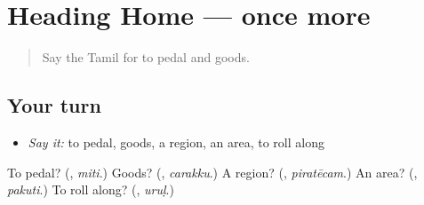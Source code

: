 \section[(dialogue)]{Heading Home — once more}

\label{lesson:TA-R452-review-final-452}



\begin{quote}
Say the Tamil for to pedal and goods.
\end{quote}

\subsection*{Your turn}
\begin{itemize}
\raggedright
  \item \emph{Say it:} to pedal, goods, a region, an area, to roll along
\end{itemize}

\begin{tcolorbox}[breakable,colback=teal!4,colframe=teal!35!black,title={Before you move on}]
To pedal? (\textbf{}, \emph{miti}.) Goods? (\textbf{}, \emph{carakku}.) A region? (\textbf{}, \emph{piratēcam}.) An area? (\textbf{}, \emph{pakuti}.) To roll along? (\textbf{}, \emph{uruḷ}.)
\end{tcolorbox}
